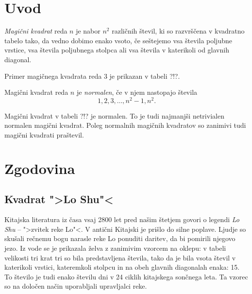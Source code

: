\documentclass[a4paper,12pt]{article}
\begin{document}
\newpage

\section{Uvod}

   \emph{Magični kvadrat} reda $n$ je nabor $n^2$ različnih števil,
   ki so razvrščena v kvadratno tabelo tako, da vedno dobimo enako vsoto,
   če seštejemo vsa števila poljubne vrstice, vsa števila poljubnega
   stolpca ali vsa števila v katerikoli od glavnih diagonal.

Primer magičnega kvadrata reda 3 je prikazan v tabeli ?!?.


   Magični kvadrat reda $n$ je \emph{normalen}, če v njem nastopajo števila
   \begin{equation}
      1, 2, 3, \ldots, n^2-1, n^2.
   \end{equation}

Magični kvadrat v tabeli ?!? je normalen.
To je tudi najmanjši netrivialen normalen magični kvadrat.
Poleg normalnih magičnih kvadratov so zanimivi tudi magični kvadrati praštevil.


\section{Zgodovina}

\subsection{Kvadrat ">Lo Shu"<}

Kitajska literatura iz časa vsaj 2800 let pred našim štetjem govori o legendi
\emph{Lo Shu} -- ">zvitek reke Lo"<. V antični Kitajski je prišlo do
silne poplave. Ljudje so skušali rečnemu bogu narasle reke Lo ponuditi daritev,
da bi pomirili njegovo jezo. Iz vode se je prikazala želva z zanimivim vzorcem
na oklepu: v tabeli velikosti tri krat tri so bila predstavljena števila, tako
da je bila vsota števil v katerikoli vrstici, kateremkoli stolpcu in na obeh
glavnih diagonalah enaka: 15. To število je tudi enako številu dni v 24 ciklih
kitajskega sončnega leta. Ta vzorec so na določen način uporabljali upravljalci
reke.
\end{document}
